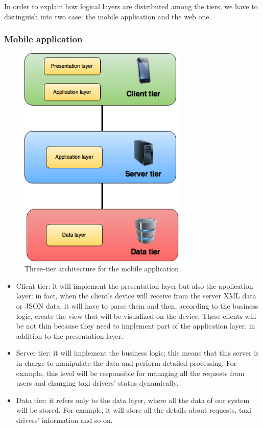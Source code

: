 In order to explain how logical layers are distributed among the tiers, we have to distinguish into two case: the mobile application and the web one.

\subsubsection{Mobile application}

    \begin{figure}[H]
        \centering
        \includegraphics[width=8cm]{./Images/MobileApplication.png}
        \caption{Three-tier architecture for the mobile application}
    \end{figure}

    \begin{itemize}
        \item Client tier: it will implement the presentation layer but also the application layer: in fact, when the client's device will receive from the server XML data or JSON data, it will have to parse them and then, according to the business logic, create the view that will be visualized on the device.
        These clients will be not thin because they need to implement part of the application layer, in addition to the presentation layer.
        \item Server tier: it will implement the business logic; this means that this server is in charge to manipulate the data and perform detailed processing. For example, this level will be responsible for managing all the requests from users and changing taxi drivers' status dynamically. 
        \item Data tier: it refers only to the data layer, where all the data of our system will be stored. For example, it will store all the details about requests, taxi drivers' information and so on.
    \end{itemize}

